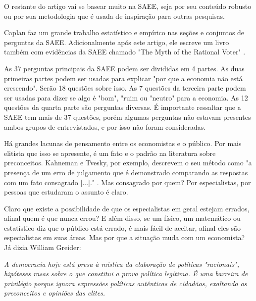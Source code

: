 O restante do artigo vai se basear muito na SAEE, seja por seu conteúdo robusto ou por sua metodologia que é usada de inspiração para outras pesquisas.

Caplan faz um grande trabalho estatístico e empírico nas seções e conjuntos de perguntas da SAEE. Adicionalmente após este artigo, ele escreve um livro também com evidências da SAEE chamado "The Myth of the Rational Voter" \cite{The_Myth_of_the_Rational_Voter}.

As 37 perguntas principais da SAEE podem ser divididas em 4 partes. As duas primeiras partes podem ser usadas para explicar "por que a economia não está crescendo". Serão 18 questões sobre isso. As 7 questões da terceira parte podem ser usadas para dizer se algo é "bom", "ruim ou "neutro" para a economia. As 12 questões da quarta parte são perguntas diversas. É importante ressaltar que a SAEE tem mais de 37 questões, porém algumas perguntas não estavam presentes ambos grupos de entrevistados, e por isso não foram consideradas.

Há grandes lacunas de pensamento entre os economistas e o público. Por mais elitista que isso se apresente, é um fato e o padrão na literatura sobre preconceitos. Kahneman e Tvesky, por exemplo, descrevem o seu método como "a presença de um erro de julgamento que é demonstrado comparando as respostas com um fato consagrado [...]." \cite{Judgment_under_Uncertainty}. Mas consagrado por quem? Por especialistas, por pessoas que estudaram o assunto é claro.

Claro que existe a possibilidade de que os especialistas em geral estejam errados, afinal quem é que nunca errou? E além disso, se um físico, um matemático ou estatístico diz que o público está errado, é mais fácil de aceitar, afinal eles são especialistas em suas áreas. Mas por que a situação muda com um economista? Já dizia William Greider:

\begin{citacao}
    \textit{
        A democracia hoje está presa à mistica da elaboração de políticas "racionais", hipóteses rasas sobre o que constitui a prova política legítima. É uma barreira de privilégio porque ignora expressões políticas autênticas de cidadãos, exaltando os preconceitos e opiniões das elites.
    } \newline
    \cite{greider2010will}

\end{citacao}

